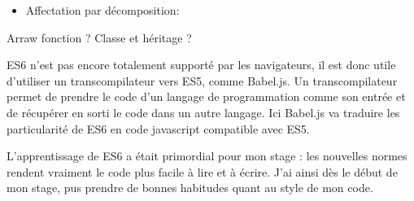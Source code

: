 \begin{itemize}
\begin{Shaded}
\begin{Highlighting}[]
\OperatorTok{=} \OperatorTok{\{} \OperatorTok{,} \OperatorTok{\}}
\OperatorTok{=} \OperatorTok{\{} \OperatorTok{:} \OperatorTok{,} \OperatorTok{:} \OperatorTok{\};}
\end{Highlighting}
\end{Shaded}
\item
  Affectation par décomposition:

\begin{Shaded}
\begin{Highlighting}[]
 \OperatorTok{\{} \OperatorTok{,} \OperatorTok{,} \OperatorTok{\}} \OperatorTok{=} \NormalTok{()}

 \OperatorTok{=} \NormalTok{()}\OperatorTok{;}
 \OperatorTok{=} \OperatorTok{;}
 \OperatorTok{=} \OperatorTok{;}
 \OperatorTok{=} \OperatorTok{;}
\end{Highlighting}
\end{Shaded}
\end{itemize}

Arraw fonction ? Classe et héritage ?

\bigskip

ES6 n'est pas encore totalement supporté par les navigateurs, il est
donc utile d'utiliser un transcompilateur vers ES5, comme Babel.js. Un
transcompilateur permet de prendre le code d'un langage de programmation
comme son entrée et de récupérer en sorti le code dans un autre langage.
Ici Babel.js va traduire les particularité de ES6 en code javascript
compatible avec ES5.

\bigskip

L'apprentissage de ES6 a était primordial pour mon stage : les nouvelles
normes rendent vraiment le code plus facile à lire et à écrire. J'ai
ainsi dès le début de mon stage, pus prendre de bonnes habitudes quant
au style de mon code.

\bigskip

